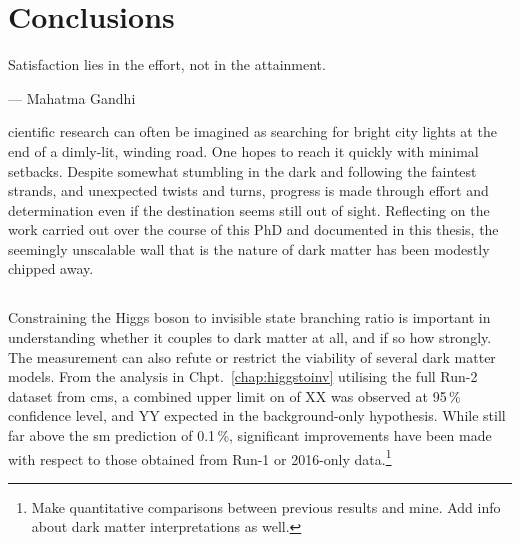 \chapter{Conclusions}
\label{chap:conclusions}

\epigraph{Satisfaction lies in the effort, not in the attainment.}{--- Mahatma Gandhi}

cientific research can often be imagined as searching for bright city lights at the end of a dimly-lit, winding road. One hopes to reach it quickly with minimal setbacks. Despite somewhat stumbling in the dark and following the faintest strands, and unexpected twists and turns, progress is made through effort and determination even if the destination seems still out of sight. Reflecting on the work carried out over the course of this PhD and documented in this thesis, the seemingly unscalable wall that is the nature of dark matter has been modestly chipped away.




\section{\texorpdfstring{\higgstoinv}{Higgs to invisible}}
\label{sec:conclusions_htoinv}

Constraining the Higgs boson to invisible state branching ratio is important in understanding whether it couples to dark matter at all, and if so how strongly. The measurement can also refute or restrict the viability of several dark matter models. From the analysis in Chpt.~\ref{chap:higgstoinv} utilising the full Run-2 dataset from \acrshort{cms}, a combined upper limit on \BRHinvFull of XX was observed at 95\,\% confidence level, and YY expected in the background-only hypothesis. While still far above the \acrlong{sm} prediction of 0.1\,\%, significant improvements have been made with respect to those obtained from Run-1 or 2016-only data.\footnote{Make quantitative comparisons between previous results and mine. Add info about dark matter interpretations as well.}


